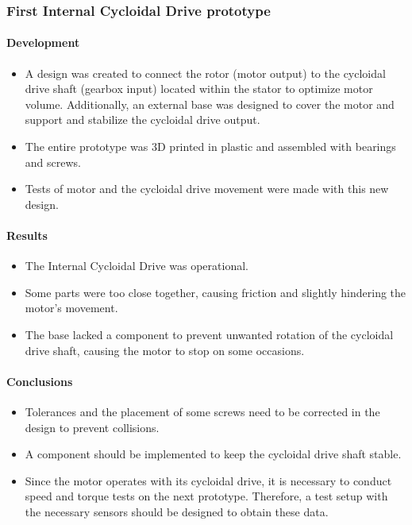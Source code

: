 \documentclass{article}
\begin{document}
\subsubsection{First \textbf{Internal} Cycloidal Drive prototype}
\paragraph[short]{Development}
\begin{itemize}
    \item A design was created to connect the rotor (motor output) to the cycloidal drive shaft (gearbox input) located within the stator to optimize motor volume. Additionally, an external base was designed to cover the motor and support and stabilize the cycloidal drive output.
    \item The entire prototype was 3D printed in plastic and assembled with bearings and screws.
    \item Tests of motor and the cycloidal drive movement were made with this new design.
\end{itemize}
\paragraph[short]{Results}
\begin{itemize}
    \item The Internal Cycloidal Drive was operational.
    \item Some parts were too close together, causing friction and slightly hindering the motor's movement.
    \item The base lacked a component to prevent unwanted rotation of the cycloidal drive shaft, causing the motor to stop on some occasions.
\end{itemize}

\paragraph[short]{Conclusions}
\begin{itemize}
    \item Tolerances and the placement of some screws need to be corrected in the design to prevent collisions.
    \item A component should be implemented to keep the cycloidal drive shaft stable.
    \item Since the motor operates with its cycloidal drive, it is necessary to conduct speed and torque tests on the next prototype. Therefore, a test setup with the necessary sensors should be designed to obtain these data.
\end{itemize}
\end{document}
